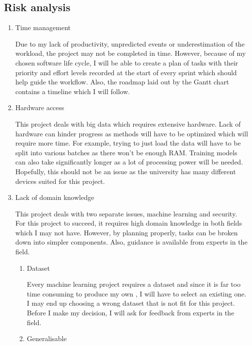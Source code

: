 \documentclass[11pt]{article}
\begin{document}
\subsection{Risk analysis}

\begin{enumerate}
  \item{Time management}

  Due to my lack of productivity, unpredicted events or underestimation of the workload, the project may not be completed in time. However, because of my chosen software life cycle, I will be able to create a plan of tasks with their priority and effort levels recorded at the start of every sprint which should help guide the workflow. Also, the roadmap laid out by the Gantt chart contains a timeline which I will follow.

  \item{Hardware access}

  This project deals with big data which requires extensive hardware. Lack of hardware can hinder progress as methods will have to be optimized which will require more time. For example, trying to just load the data will have to be split into various batches as there won’t be enough RAM. Training models can also take significantly longer as a lot of processing power will be needed. Hopefully, this should not be an issue as the university has many different devices suited for this project. 

  \item{Lack of domain knowledge}

  This project deals with two separate issues, machine learning and security. For this project to succeed, it requires high domain knowledge in both fields which I may not have. However, by planning properly, tasks can be broken down into simpler components. Also, guidance is available from experts in the field.



  \begin{enumerate}
    \item{Dataset}

    Every machine learning project requires a dataset and since it is far too time consuming to produce my own \cite{methodology-general}, I will have to select an existing one. I may end up choosing a wrong dataset that is not fit for this project. Before I make my decision, I will ask for feedback from experts in the field.

    \item{Generalisable}


\end{enumerate}
\end{enumerate}
\end{document}
